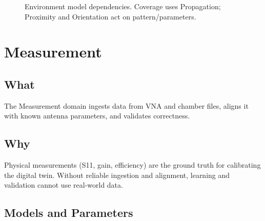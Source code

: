 \documentclass[11pt,a4paper]{article}
\begin{document}
\begin{figure}[htbp]
\centering
{}
\caption{Environment model dependencies. Coverage uses Propagation; Proximity and Orientation act on pattern/parameters.}
\end{figure}

\section{Measurement}

\subsection{What}
The Measurement domain ingests data from VNA and chamber files, aligns it with known antenna parameters, and validates correctness.

\subsection{Why}
Physical measurements (S11, gain, efficiency) are the ground truth for calibrating the digital twin. Without reliable ingestion and alignment, learning and validation cannot use real-world data.

\subsection{Models and Parameters}
\end{document}
